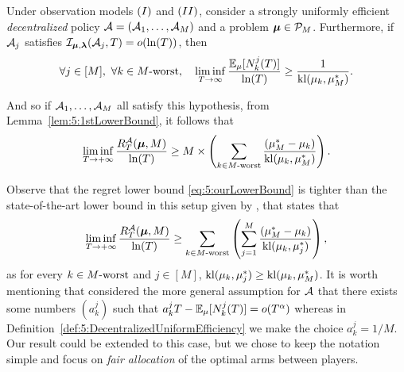 \begin{theorem}\label{thm:5:BetterLowerBound}
\begin{leftbar}[theorembar]  %
  Under observation models $(I)$ and $(II)$, consider a strongly uniformly efficient \emph{decentralized} policy $\mathcal{A}=(\mathcal{A}_1,\dots,\mathcal{A}_M)$ and a problem $\boldsymbol{\mu}\in\mathcal{P}_M$.
  Furthermore, if $\mathcal{A}_j$ satisfies $\mathcal{I}_{\bm{\mu},\bm{\lambda}}(\mathcal{A}_j,T) = \mathop{}\mathopen{}o\mathopen{}\left(\ln(T)\right)$, then
  \begin{equation}\label{eq:5:LBDraws}
    \forall j \in [M], \ \forall k \in M\text{-}\mathrm{worst}, \ \ \ \liminf_{T\to \infty} \frac{\mathbb{E}_{\mu}[N_k^j(T)]}{\ln(T)} \geq \frac{1}{\mathrm{kl}(\mu_k, \mu_M^*)}.
  \end{equation}

  \noindent And so if $\mathcal{A}_1,\dots,\mathcal{A}_M$ all satisfy this hypothesis, from Lemma~\ref{lem:5:1stLowerBound}, it follows that
  \begin{equation}\label{eq:5:ourLowerBound}
    \mathop{\lim\inf}\limits_{T \to +\infty} \frac{R_T^{\mathcal{A}}(\boldsymbol{\mu}, M)}{\ln(T)}
    \geq M \times \left( \sum_{k \in M\text{-}\mathrm{worst}} \frac{(\mu_M^* -  \mu_k)}{\mathrm{kl}(\mu_k, \mu_M^*)} \right) .
  \end{equation}
\end{leftbar}  %
\end{theorem}


Observe that the regret lower bound \eqref{eq:5:ourLowerBound} is tighter than the state-of-the-art lower bound in this setup
given by \cite{Zhao10}, that states that
\begin{equation}\label{eq:5:Zhao10LowerBound}
  \mathop{\lim\inf}\limits_{T \to +\infty} \frac{R_T^{\mathcal{A}}(\boldsymbol{\mu}, M)}{\ln(T)}
  \geq \sum_{k \in M\text{-}\mathrm{worst}} \left( \sum_{j=1}^{M} \frac{(\mu_M^* -  \mu_k)}{\mathrm{kl}(\mu_k, \mu_{j}^*)} \right),
\end{equation}
as for every $k \in M\text{-}\mathrm{worst}$ and $j \in [M]$, $\mathrm{kl}(\mu_k, \mu_j^*) \geq \mathrm{kl}(\mu_k, \mu_M^*)$.
%
It is worth mentioning that \cite{Zhao10} considered the more general assumption for $\mathcal{A}$ that there exists some numbers $(a_{k}^j)$ such that $a_{k}^j T - \mathbb{E}_{\mu}[N_k^j(T)] = o(T^\alpha)$ whereas in Definition~\ref{def:5:DecentralizedUniformEfficiency} we make the choice $a_{k}^j = 1/M$.
Our result could be extended to this case, but we chose to keep the notation simple and focus on \emph{fair allocation} of the optimal arms between players.


